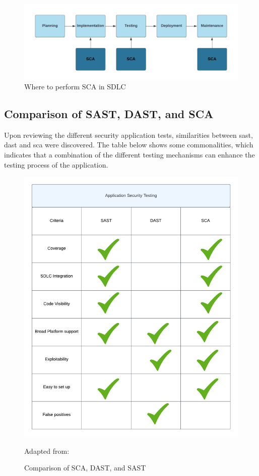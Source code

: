 \vspace{2mm}
\begin{figure}[H]
    \centering
    \includegraphics[width=0.8\columnwidth]{Images/sca.png}
    \caption{Where to perform SCA in SDLC} 
    \label{fig: Where to perform SCA in SDLC}
\end{figure}

\newpage
\subsection{Comparison of SAST, DAST, and SCA}
Upon reviewing the different security application tests, similarities between \acrshort{sast}, \acrshort{dast} and \acrshort{sca} were discovered. The table below shows some commonalities, which indicates that a combination of the different testing mechanisms can enhance the testing process of the application. 

\vspace{2mm}
\begin{figure}[H]
    \centering
    \includegraphics[width=0.8\columnwidth]{Images/ApplicationSecurityTesting.png}
    \caption{Comparison of SCA, DAST, and SAST}Adapted from: \cite{Comparison}
    \label{fig: Comparison of SCA, DAST, and SASt}
\end{figure}

